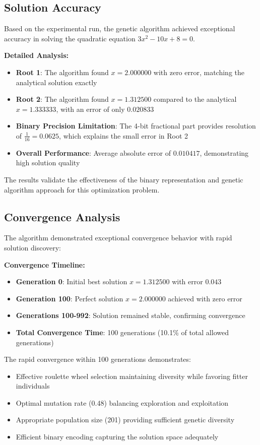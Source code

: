 \documentclass[11pt,a4paper]{article}
\begin{document}
\subsection{Solution Accuracy}
Based on the experimental run, the genetic algorithm achieved exceptional accuracy in solving the quadratic equation $3x^2 - 10x + 8 = 0$.

\textbf{Detailed Analysis:}
\begin{itemize}
    \item \textbf{Root 1}: The algorithm found $x = 2.000000$ with zero error, matching the analytical solution exactly
    \item \textbf{Root 2}: The algorithm found $x = 1.312500$ compared to the analytical $x = 1.333333$, with an error of only $0.020833$
    \item \textbf{Binary Precision Limitation}: The 4-bit fractional part provides resolution of $\frac{1}{16} = 0.0625$, which explains the small error in Root 2
    \item \textbf{Overall Performance}: Average absolute error of $0.010417$, demonstrating high solution quality
\end{itemize}

The results validate the effectiveness of the binary representation and genetic algorithm approach for this optimization problem.

\subsection{Convergence Analysis}
The algorithm demonstrated exceptional convergence behavior with rapid solution discovery:

\textbf{Convergence Timeline:}
\begin{itemize}
    \item \textbf{Generation 0}: Initial best solution $x = 1.312500$ with error $0.043$
    \item \textbf{Generation 100}: Perfect solution $x = 2.000000$ achieved with zero error
    \item \textbf{Generations 100-992}: Solution remained stable, confirming convergence
    \item \textbf{Total Convergence Time}: 100 generations (10.1\% of total allowed generations)
\end{itemize}

The rapid convergence within 100 generations demonstrates:
\begin{itemize}
    \item Effective roulette wheel selection maintaining diversity while favoring fitter individuals
    \item Optimal mutation rate (0.48) balancing exploration and exploitation
    \item Appropriate population size (201) providing sufficient genetic diversity
    \item Efficient binary encoding capturing the solution space adequately
\end{itemize}
\end{document}
